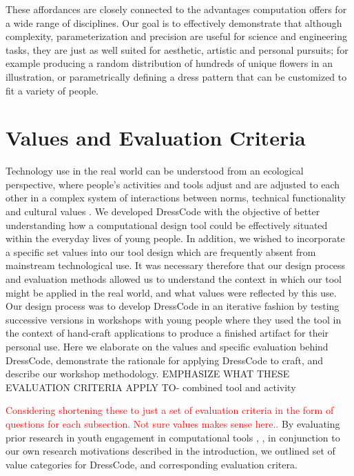 \documentclass{sigchi}
\begin{document}
These affordances are closely connected to the advantages computation offers for a wide range of disciplines. Our goal is to effectively demonstrate that although complexity, parameterization and precision are useful for science and engineering tasks, they are just as well suited for aesthetic, artistic and personal pursuits; for example producing a random distribution of hundreds of unique flowers in an illustration, or parametrically defining a dress pattern that can be customized to fit a variety of people. 


\section{Values and Evaluation Criteria}
 Technology use in the real world can be understood from an ecological perspective, where people's activities and tools adjust and are adjusted to each other in a complex system of interactions between norms, technical functionality and cultural values \cite{information_ecologies}. We developed DressCode with the objective of better understanding how a computational design tool could be effectively situated within the everyday lives of young people. In addition, we wished to incorporate a specific set values into our tool design which are frequently absent from mainstream technological use. It was necessary therefore that our design process and evaluation methods allowed us to understand the context in which our tool might be applied in the real world, and what values were reflected by this use. Our design process was to develop DressCode in an iterative fashion by testing successive versions in workshops with young people where they used the tool in the context of hand-craft applications to produce a finished artifact for their personal use. Here we elaborate on the values and specific evaluation behind DressCode, demonstrate the rationale for applying DressCode to craft, and describe our workshop methodology. EMPHASIZE WHAT THESE EVALUATION CRITERIA APPLY TO- combined tool and activity

\textcolor{red}{Considering shortening these to just a set of evaluation criteria in the form of questions for each subsection. Not sure values makes sense here..}
By evaluating prior research in youth engagement in computational tools \cite{computational_thinking}, \cite{introductory_programming}, in conjunction to our own research motivations described in the introduction, we outlined set of value categories for DressCode, and corresponding evaluation critera.
\end{document}
